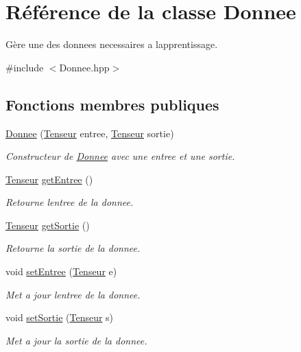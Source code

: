 \hypertarget{classDonnee}{}\section{Référence de la classe Donnee}
\label{classDonnee}


Gère une des donnees necessaires a l\textquotesingle{}apprentissage.  




{\ttfamily \#include $<$Donnee.\+hpp$>$}

\subsection*{Fonctions membres publiques}
\begin{DoxyCompactItemize}
\item 
\mbox{\label{classDonnee_a41bbb1e9a6835479eefa2a694ddd5da3}} 
\hyperlink{classDonnee_a41bbb1e9a6835479eefa2a694ddd5da3}{Donnee} (\hyperlink{classTenseur}{Tenseur} entree, \hyperlink{classTenseur}{Tenseur} sortie)
\begin{DoxyCompactList}\small\item\em Constructeur de \hyperlink{classDonnee}{Donnee} avec une entree et une sortie. \end{DoxyCompactList}\item 
\hyperlink{classTenseur}{Tenseur} \hyperlink{classDonnee_af4b02bb80cd289073f1eb56fc9046c11}{get\+Entree} ()
\begin{DoxyCompactList}\small\item\em Retourne l\textquotesingle{}entree de la donnee. \end{DoxyCompactList}\item 
\hyperlink{classTenseur}{Tenseur} \hyperlink{classDonnee_aadc9c0ab3f163fa6c0e57daa57023de0}{get\+Sortie} ()
\begin{DoxyCompactList}\small\item\em Retourne la sortie de la donnee. \end{DoxyCompactList}\item 
void \hyperlink{classDonnee_ad8f000cbd829b3f3485cc158b5a92514}{set\+Entree} (\hyperlink{classTenseur}{Tenseur} e)
\begin{DoxyCompactList}\small\item\em Met a jour l\textquotesingle{}entree de la donnee. \end{DoxyCompactList}\item 
void \hyperlink{classDonnee_adbcb8dc22a69b7c0fffca3dbbef4623b}{set\+Sortie} (\hyperlink{classTenseur}{Tenseur} s)
\begin{DoxyCompactList}\small\item\em Met a jour la sortie de la donnee. \end{DoxyCompactList}\end{DoxyCompactItemize}


